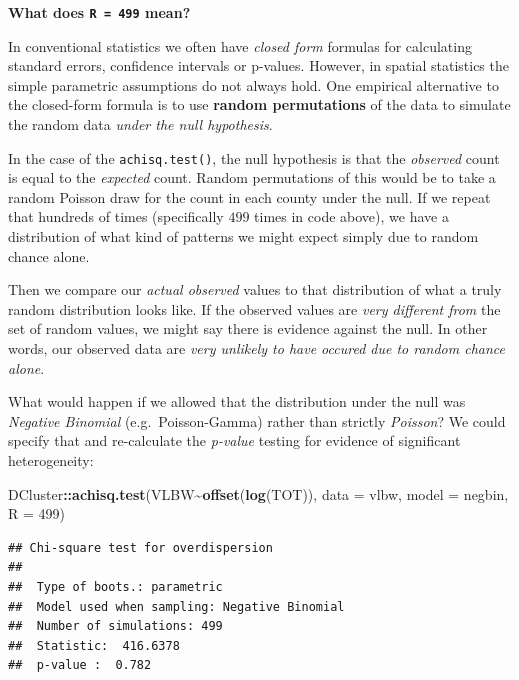 \documentclass[
]{book}
\newenvironment{Shaded}{\begin{snugshade}}{\end{snugshade}}
\newcommand{\AttributeTok}[1]{\textcolor[rgb]{0.13,0.29,0.53}{#1}}
\newcommand{\DecValTok}[1]{\textcolor[rgb]{0.00,0.00,0.81}{#1}}
\newcommand{\FunctionTok}[1]{\textcolor[rgb]{0.13,0.29,0.53}{\textbf{#1}}}
\newcommand{\NormalTok}[1]{#1}
\newcommand{\SpecialCharTok}[1]{\textcolor[rgb]{0.81,0.36,0.00}{\textbf{#1}}}
\newcommand{\StringTok}[1]{\textcolor[rgb]{0.31,0.60,0.02}{#1}}
\newenvironment{rmdnote}[1]
  {
  \begin{itemize}
  \renewcommand{\labelitemi}{
    \raisebox{-.7\height}[0pt][0pt]{
      {\setkeys{Gin}{width=3em,keepaspectratio}\texttt{[image: images/\#1]}}
    }
  }
  \setlength{\fboxsep}{1em}
  \begin{note}
  \item
  }
  {
  \end{note}
  \end{itemize}
  }
\begin{document}
\begin{rmdnote}{note}
\textbf{What does \texttt{R\ =\ 499} mean?}

In conventional statistics we often have \emph{closed form} formulas for calculating standard errors, confidence intervals or p-values. However, in spatial statistics the simple parametric assumptions do not always hold. One empirical alternative to the closed-form formula is to use \textbf{random permutations} of the data to simulate the random data \emph{under the null hypothesis}.

In the case of the \texttt{achisq.test()}, the null hypothesis is that the \emph{observed} count is equal to the \emph{expected} count. Random permutations of this would be to take a random Poisson draw for the count in each county under the null. If we repeat that hundreds of times (specifically \(499\) times in code above), we have a distribution of what kind of patterns we might expect simply due to random chance alone.

Then we compare our \emph{actual observed} values to that distribution of what a truly random distribution looks like. If the observed values are \emph{very different from} the set of random values, we might say there is evidence against the null. In other words, our observed data are \emph{very unlikely to have occured due to random chance alone}.

\end{rmdnote}

What would happen if we allowed that the distribution under the null was \emph{Negative Binomial} (e.g.~Poisson-Gamma) rather than strictly \emph{Poisson}? We could specify that and re-calculate the \emph{p-value} testing for evidence of significant heterogeneity:

\begin{Shaded}
\begin{Highlighting}[]
\NormalTok{DCluster}\SpecialCharTok{::}\FunctionTok{achisq.test}\NormalTok{(VLBW}\SpecialCharTok{\textasciitilde{}}\FunctionTok{offset}\NormalTok{(}\FunctionTok{log}\NormalTok{(TOT)), }
                      \AttributeTok{data =}\NormalTok{ vlbw, }
                      \AttributeTok{model =} \StringTok{\textquotesingle{}negbin\textquotesingle{}}\NormalTok{,}
                      \AttributeTok{R =} \DecValTok{499}\NormalTok{)}
\end{Highlighting}
\end{Shaded}

\begin{verbatim}
## Chi-square test for overdispersion 
## 
##  Type of boots.: parametric 
##  Model used when sampling: Negative Binomial 
##  Number of simulations: 499 
##  Statistic:  416.6378 
##  p-value :  0.782
\end{verbatim}
\end{document}
